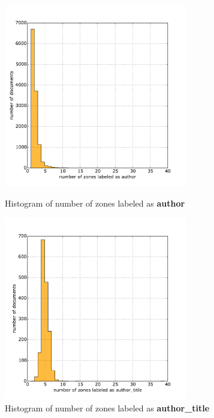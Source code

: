 \begin{figure}
\centering
\begin{minipage}[t!]{0.48\linewidth}
  \includegraphics[width=8cm]{plots/author_histogram}
  \caption{Histogram of number of zones labeled as \textbf{author}}
  \label{fig:_histogram}
\end{minipage}
\quad
\begin{minipage}[t!]{0.48\linewidth}
  \includegraphics[width=8cm]{plots/author_title_histogram}
  \caption{Histogram of number of zones labeled as \textbf{author\_title}}
  \label{fig:_histogram}
\end{minipage}
\end{figure}

